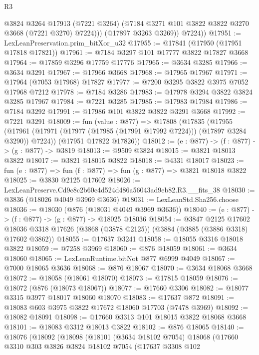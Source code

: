 \begin{lexlean}{R3}
\begin{coremodule}
              @3824
              @3264
              @17913
              (@7221 @3264)
              (@7184 @3271 @101 @3822 @3822 @3270 @3668 (@7221 @3270) @7224)))
          (@17897 @3263 @3269))
        @7224))
@17951 := LexLeanPreservation.prim_bitXor_u32
@17955 := @17841 (@17950 (@17951 @17818 @17821))
@17961 := @7184 @3297 @101 @17777 @3822 @17827 @3668
@17964 := @17859 @3296 @17759 @17776
@17965 := @3634 @3285
@17966 := @3634 @3291
@17967 := @17966 @3668
@17968 := @17965 @17967
@17971 := @17964 (@7053 @17968) @17827
@17977 := @7200 @3295 @3822 @3975 @7052 @17968 @7212
@17978 := @7184 @3286
@17983 := @17978 @3294 @3822 @3824 @3285 @17967
@17984 := @7221 @3285
@17985 := @17983 @17984
@17986 := @7184 @3292
@17991 := @17986 @101 @3822 @3822 @3291 @3668
@17992 := @7221 @3291
@18009 := fun (value : @877) =>
  @17808
    (@17835
      (@17955 (@17961 (@17971 (@17977 (@17985 (@17991 @17992 @7224))) (@17897 @3284 @3290)) @7224))
      (@17951 @17822 @17826))
@18012 := (e : @877) -> (f : @877) -> (g : @877) -> @3819
@18013 := @9509 @3824
@18015 := @3821 @18013 @3822
@18017 := @3821 @18015 @3822
@18018 := @4331 @18017
@18023 := fun (e : @877) => fun (f : @877) => fun (g : @877) => @3821 @18018 @3822
@18025 := @3830 @2125 @17602
@18026 := LexLeanPreserve.Cd9c8c2b60c4d524d486a56043ad9eb82.R3.__fits_38
@18030 := @3836 (@18026 @4049 @3969 @3636)
@18031 := LexLeanStd.Sha256.choose
@18036 := @18030 (@876 (@18031 @4049 @3969 @3636))
@18040 := (e : @877) -> (f : @877) -> (g : @877) -> @18025 @18036
@18054 := @3847
    @2125
    @17602
    @18036
    @3318
    @17626
    (@3868 (@3878 @2125))
    (@3884 (@3885 (@3886 @3318) @17602 @3862))
@18055 := @17637 @3241
@18058 := @18055 @3316 @18018 @3822
@18059 := @7258 @3969
@18060 := @876 @18059
@18061 := @3634 @18060
@18065 := LexLeanRuntime.bitNot @877 @6999 @4049
@18067 := @7000 @18065 @3636
@18068 := @876 @18067
@18070 := @3634 @18068 @3668
@18072 := @18058 (@18061 @18070)
@18073 := @17815 @18059
@18076 := @18072 (@876 (@18073 @18067))
@18077 := @17660 @3306
@18082 := @18077 @3315 @3977 @18017 @18060 @18070
@18083 := @17637 @872
@18091 := @18083 @603 @3975 @3822 @17672 @18060 @17703 (@7478 @3969)
@18092 := @18082 @18091
@18098 := @17660 @3313 @101 @18015 @3822 @18068 @3668
@18101 := @18083 @3312 @18013 @3822
@18102 := @876 @18065
@18140 := @18076
    (@18092
      (@18098
        (@18101
          (@3634 @18102 @7054)
          @18068
          (@17660
            @3310
            @303
            @3826
            @3824
            @18102
            @7054
            (@17637
              @3308
              @102

\end{coremodule}
\end{lexlean}
